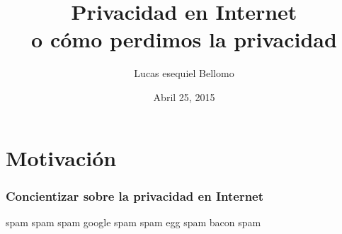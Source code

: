 \documentclass{beamer}
\title{Privacidad en Internet \\ o cómo perdimos la privacidad}
\author{Lucas esequiel Bellomo}
\date{Abril 25, 2015}
\begin{document}
\begin{frame}
\titlepage
\end{frame}

\section{Motivación}

\begin{frame}
\frametitle{Concientizar sobre la privacidad en Internet}
spam spam spam google spam
\pause
spam egg spam
\pause
bacon spam

\end{frame}
\end{document}
